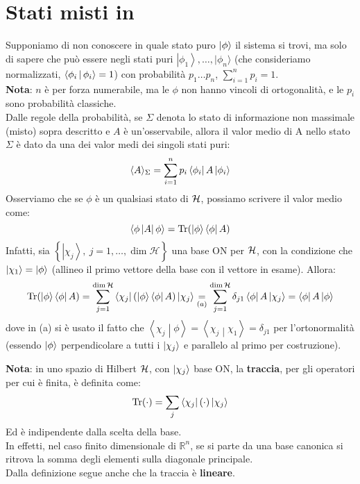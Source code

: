 \documentclass[../../FisicaTeorica.tex]{subfiles}
\begin{document}
\section{Stati misti in \MQ}
Supponiamo di non conoscere in quale stato puro $\Ket{\phi}$ il sistema si trovi, ma solo di sapere che può essere negli stati puri $\left|\phi_1\right\rangle,\dots, |\phi_n\rangle $ (che consideriamo normalizzati, $\Braket{\phi_i|\phi_i}=1$) con probabilità $p_1\dots p_n$, $\sum_{i=1}^{n}p_i=1$.\\
\textbf{Nota}: $n$ è per forza numerabile, ma le $\phi$ non hanno vincoli di ortogonalità, e le $p_i$ sono probabilità classiche.\\
Dalle regole della probabilità, se $\Sigma$ denota lo stato di informazione non massimale (misto) sopra descritto e $A$ è un'osservabile, allora il valor medio di A nello stato $\Sigma$ è dato da una  dei valor medi dei singoli stati puri:
\[
\langle A \rangle_\Sigma = \sum_{i=1}^n p_i\Bra{\phi_i}A\Ket{\phi_i}
\]
Osserviamo che se $\phi$ è un qualsiasi stato di $\mathcal{H}$, possiamo scrivere il valor medio come:
\[
\left\langle\phi\left|A\right|\phi\right\rangle
=\operatorname{Tr}(\Ket{\phi}\Bra{\phi}A)
\]
Infatti, sia $\left\{\left|\chi_j\right\rangle,\
j=1,\ldots,\dim{\mathcal{H}}\right\}$ una base ON per $\mathcal{H}$, con la condizione che $\left|\chi_1\right\rangle=\Ket{\phi}$ (allineo il primo vettore della base con il vettore in esame). Allora:
\[
\operatorname{Tr}(\Ket{\phi}\Bra{\phi}A) = \sum_{j=1}^{\operatorname{dim}\mathcal{H}}\Bra{\chi_j}(\Ket{\phi}\Bra{\phi}A)\Ket{\chi_j} \underset{(a)}{=} \sum_{j=1}^{\operatorname{dim}\mathcal{H}}\delta_{j1}\Bra{\phi}A\Ket{\chi_j} = \Bra{\phi}A\Ket{\phi}
\]
dove in (a) si è usato il fatto che $\left\langle\chi_j\middle|\phi\right\rangle=\left\langle\chi_j\middle|\chi_1\right\rangle=\delta_{j1}$ per l'ortonormalità (essendo $\Ket{\phi}$ perpendicolare a tutti i $\Ket{\chi_j}$ e parallelo al primo per costruzione).
\begin{mdframed}[hidealllines=true,backgroundcolor=green!20,innerleftmargin=3pt,innerrightmargin=3pt,leftmargin=-3pt,rightmargin=-3pt]
\textbf{Nota}: in uno spazio di Hilbert\index{Traccia} $\mathcal{H}$, con $\Ket{\chi_j}$ base ON, la \textbf{traccia}, per gli operatori per cui è finita, è definita come:
\[
\operatorname{Tr}(\cdot) = \sum_j \Bra{\chi_j} (\cdot) \Ket{\chi_j}
\]
Ed è indipendente dalla scelta della base.\\
In effetti, nel caso finito dimensionale di $\mathbb{R}^n$, se si parte da una base canonica si ritrova la somma degli elementi sulla diagonale principale.\\
Dalla definizione segue anche che la traccia è \textbf{lineare}.
\end{mdframed}
\end{document}
